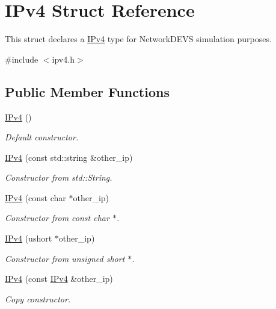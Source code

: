 \hypertarget{structIPv4}{}\section{I\+Pv4 Struct Reference}
\label{structIPv4}


This struct declares a \hyperlink{structIPv4}{I\+Pv4} type for Network\+D\+E\+VS simulation purposes.  




{\ttfamily \#include $<$ipv4.\+h$>$}

\subsection*{Public Member Functions}
\begin{DoxyCompactItemize}
\item 
\hyperlink{structIPv4_ac1982a68d4cd0e2f83165659ec1c41fb}{I\+Pv4} ()
\begin{DoxyCompactList}\small\item\em Default constructor. \end{DoxyCompactList}\item 
\hyperlink{structIPv4_a08282c7d0d3411aee1135ba0195d27c6}{I\+Pv4} (const std\+::string \&other\+\_\+ip)
\begin{DoxyCompactList}\small\item\em Constructor from std\+::\+String. \end{DoxyCompactList}\item 
\hyperlink{structIPv4_a719104625fa0bd5890348ee1be6b370f}{I\+Pv4} (const char $\ast$other\+\_\+ip)
\begin{DoxyCompactList}\small\item\em Constructor from const char $\ast$. \end{DoxyCompactList}\item 
\hyperlink{structIPv4_ac8dddaa9a429dcffdd72c6adc5ebf742}{I\+Pv4} (ushort $\ast$other\+\_\+ip)
\begin{DoxyCompactList}\small\item\em Constructor from unsigned short $\ast$. \end{DoxyCompactList}\item 
\hyperlink{structIPv4_ad8d3deea36179f336b91123feea5dadd}{I\+Pv4} (const \hyperlink{structIPv4}{I\+Pv4} \&other\+\_\+ip)
\begin{DoxyCompactList}\small\item\em Copy constructor. \end{DoxyCompactList}\item 

\end{DoxyCompactItemize}
